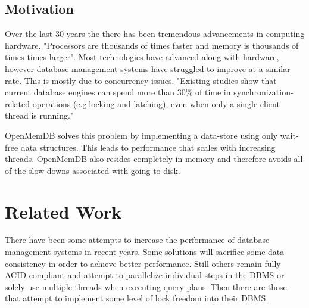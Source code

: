 \documentclass[letter,11pt]{article}
\begin{document}
\subsection{Motivation}
Over the last 30 years the there has been tremendous advancements in computing
hardware. "Processors are thousands of times faster and memory is thousands of
times times larger"\cite{stonebraker2007end}. Most technologies have advanced 
along with hardware, however database management systems have struggled to improve
at a similar rate. This is mostly due to concurrency issues. "Existing studies show
that current database engines can spend more than 30\% of time in 
synchronization-related operations (e.g.locking and latching), even when only a 
single client thread is running."\cite{soares2015database}
\par\vspace{\baselineskip}
OpenMemDB solves this problem by implementing a data-store using only wait-free data
structures. This leads to performance that scales with increasing threads. OpenMemDB also
resides completely in-memory and therefore avoids all of the slow downs associated with
going to disk.
\par\vspace{\baselineskip}

\section{Related Work}
There have been some attempts to increase the performance of database management
systems in recent years. Some solutions will sacrifice
some data consistency in order to achieve better performance. Still others
remain fully ACID compliant and attempt to parallelize individual steps in the 
DBMS or solely use multiple threads when executing query plans. Then there are those
that attempt to implement some level of lock freedom into their DBMS.
\par\vspace{\baselineskip}
\end{document}
